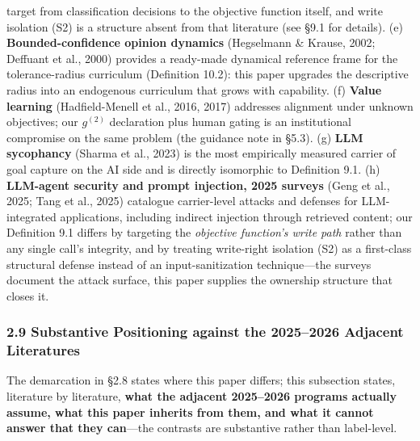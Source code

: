 \documentclass[
  11pt]{article}
\begin{document}
target from classification decisions to the objective function itself,
and write isolation (S2) is a structure absent from that literature (see
§9.1 for details). (e) \textbf{Bounded-confidence opinion dynamics}
(Hegselmann \& Krause, 2002; Deffuant et al., 2000) provides a
ready-made dynamical reference frame for the tolerance-radius curriculum
(Definition 10.2): this paper upgrades the descriptive radius into an
endogenous curriculum that grows with capability. (f) \textbf{Value
learning} (Hadfield-Menell et al., 2016, 2017) addresses alignment under
unknown objectives; our \(g^{(2)}\) declaration plus human gating is an
institutional compromise on the same problem (the guidance note in
§5.3). (g) \textbf{LLM sycophancy} (Sharma et al., 2023) is the most
empirically measured carrier of goal capture on the AI side and is
directly isomorphic to Definition 9.1. (h) \textbf{LLM-agent security
and prompt injection, 2025 surveys} (Geng et al., 2025; Tang et al.,
2025) catalogue carrier-level attacks and defenses for LLM-integrated
applications, including indirect injection through retrieved content;
our Definition 9.1 differs by targeting the \emph{objective function's
write path} rather than any single call's integrity, and by treating
write-right isolation (S2) as a first-class structural defense instead
of an input-sanitization technique---the surveys document the attack
surface, this paper supplies the ownership structure that closes it.

\subsubsection{2.9 Substantive Positioning against the 2025--2026
Adjacent
Literatures}\label{substantive-positioning-against-the-20252026-adjacent-literatures}

The demarcation in §2.8 states where this paper differs; this subsection
states, literature by literature, \textbf{what the adjacent 2025--2026
programs actually assume, what this paper inherits from them, and what
it cannot answer that they can}---the contrasts are substantive rather
than label-level.
\end{document}
